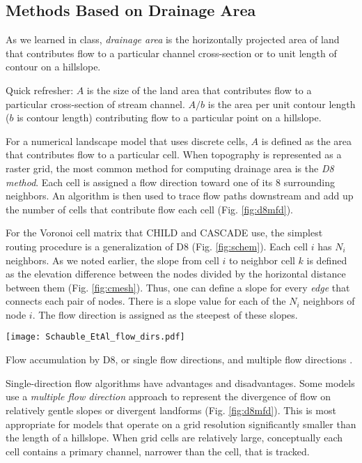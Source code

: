 \documentclass[12pt,reqno]{amsart}
\begin{document}
\subsection{Methods Based on Drainage Area}

As we learned in class, {\em drainage area} is the horizontally projected area of land that contributes flow to a particular channel cross-section or to unit length of contour on a hillslope.

Quick refresher: $A$ is the size of the land area that contributes flow to a particular cross-section of stream channel. $A/b$ is the area per unit contour length ($b$ is contour length) contributing flow to a particular point on a hillslope.

For a numerical landscape model that uses discrete cells, $A$ is defined as the area that contributes flow to a particular cell. When topography is represented as a raster grid, the most common method for computing drainage area is the {\em D8 method}. Each cell is assigned a flow direction toward one of its 8 surrounding neighbors. An algorithm is then used to trace flow paths downstream and add up the number of cells that contribute flow each cell (Fig. \ref{fig:d8mfd}).

For the Voronoi cell matrix that CHILD and CASCADE use, the simplest routing procedure is a generalization of D8 (Fig. \ref{fig:schem}). Each cell $i$ has $N_i$ neighbors. As we noted earlier, the slope from cell $i$ to neighbor cell $k$ is defined as the elevation difference between the nodes divided by the horizontal distance between them (Fig. \ref{fig:cmesh}). Thus, one can define a slope for every {\em edge} that connects each pair of nodes. There is a slope value for each of the $N_i$ neighbors of node $i$. The flow direction is assigned as the steepest of these slopes.

\begin{floatingfigure}{4.1in}
\centering
\texttt{[image: Schauble\_EtAl\_flow\_dirs.pdf]}
\captionsetup{width=3.7in}
\caption{Flow accumulation by D8, or single flow directions, and multiple flow directions \citep{schauble2008}.}
\label{fig:d8mfd}
\end{floatingfigure}

Single-direction flow algorithms have advantages and disadvantages. Some models use a {\em multiple flow direction} approach to represent the divergence of flow on relatively gentle slopes or divergent landforms (Fig. \ref{fig:d8mfd}). This is most appropriate for models that operate on a grid resolution significantly smaller than the length of a hillslope. When grid cells are relatively large, conceptually each cell contains a primary channel, narrower than the cell, that is tracked.
\end{document}
